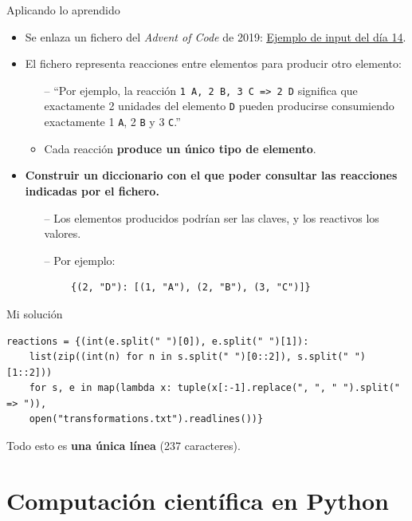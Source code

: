 \documentclass[10pt]{beamer} %
\begin{document}
\begin{frame}[fragile]{Aplicando lo aprendido}
    \begin{itemize}
        \item Se enlaza un fichero del \textit{Advent of Code} de 2019: \href{https://github.com/0xb01u/AoC-2019/blob/master/Day\_14/example.txt}{\underline{Ejemplo de input del día 14}}.
        \item El fichero representa reacciones entre elementos para producir otro elemento:
        \begin{itemize}
            \item[--] ``Por ejemplo, la reacción \texttt{1 A, 2 B, 3 C => 2 D} significa que exactamente 2 unidades del elemento \texttt{D} pueden producirse consumiendo exactamente 1 \texttt{A}, 2 \texttt{B} y 3 \texttt{C}.''
            \item Cada reacción \textbf{produce un único tipo de elemento}.
        \end{itemize}
        \item \textbf{Construir un diccionario con el que poder consultar las reacciones indicadas por el fichero.}
        \begin{itemize}
            \item[--] Los elementos producidos podrían ser las claves, y los reactivos los valores.
            \item[--] Por ejemplo:
        \end{itemize}
        \begin{verbatim}
        {(2, "D"): [(1, "A"), (2, "B"), (3, "C")]}
        \end{verbatim}
    \end{itemize}
\end{frame}

\begin{frame}[fragile]{Mi solución}
    \begin{verbatim}
reactions = {(int(e.split(" ")[0]), e.split(" ")[1]):
    list(zip((int(n) for n in s.split(" ")[0::2]), s.split(" ")[1::2]))
    for s, e in map(lambda x: tuple(x[:-1].replace(", ", " ").split(" => ")),
    open("transformations.txt").readlines())}
    \end{verbatim}
    Todo esto es \textbf{una única línea} (237 caracteres).
\end{frame}

\section{Computación científica en Python}
\end{document}
